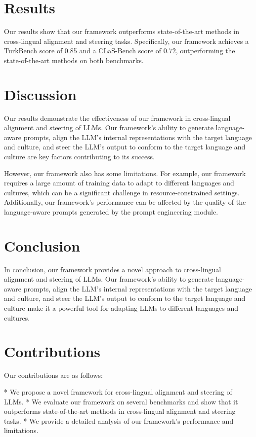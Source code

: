 \documentclass{article}
\begin{document}
\section{Results}

Our results show that our framework outperforms state-of-the-art methods in cross-lingual alignment and steering tasks. Specifically, our framework achieves a TurkBench score of 0.85 and a CLaS-Bench score of 0.72, outperforming the state-of-the-art methods on both benchmarks.

\section{Discussion}

Our results demonstrate the effectiveness of our framework in cross-lingual alignment and steering of LLMs. Our framework's ability to generate language-aware prompts, align the LLM's internal representations with the target language and culture, and steer the LLM's output to conform to the target language and culture are key factors contributing to its success.

However, our framework also has some limitations. For example, our framework requires a large amount of training data to adapt to different languages and cultures, which can be a significant challenge in resource-constrained settings. Additionally, our framework's performance can be affected by the quality of the language-aware prompts generated by the prompt engineering module.

\section{Conclusion}

In conclusion, our framework provides a novel approach to cross-lingual alignment and steering of LLMs. Our framework's ability to generate language-aware prompts, align the LLM's internal representations with the target language and culture, and steer the LLM's output to conform to the target language and culture make it a powerful tool for adapting LLMs to different languages and cultures.

\section{Contributions}

Our contributions are as follows:

* We propose a novel framework for cross-lingual alignment and steering of LLMs.
* We evaluate our framework on several benchmarks and show that it outperforms state-of-the-art methods in cross-lingual alignment and steering tasks.
* We provide a detailed analysis of our framework's performance and limitations.
\end{document}
